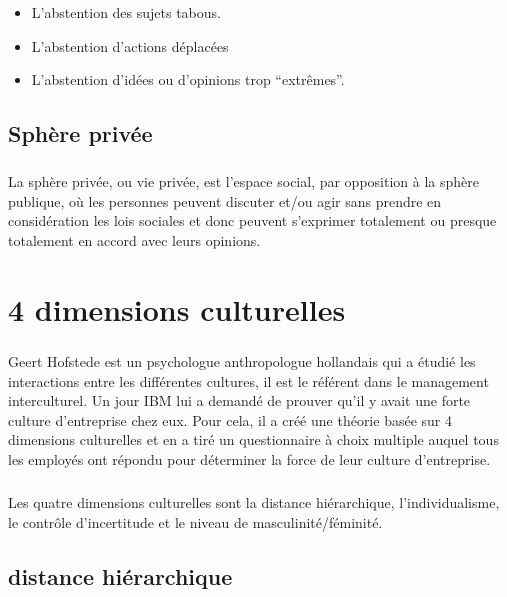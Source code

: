 \begin{itemize}
	\item L'abstention des sujets tabous.
	\item L'abstention d'actions déplacées
	\item L'abstention d'idées ou d'opinions trop ``extrêmes''.
\end{itemize}

\section{Sphère privée}

\paragraph{} La sphère privée, ou vie privée, est l'espace social, par
opposition à la sphère publique, où les personnes peuvent discuter et/ou agir
sans prendre en considération les lois sociales et donc peuvent s'exprimer
totalement ou presque totalement en accord avec leurs opinions.

\chapter{4 dimensions culturelles}

\paragraph{} Geert Hofstede est un psychologue anthropologue hollandais qui a
étudié les interactions entre les différentes cultures, il est le référent dans
le management interculturel. Un jour IBM lui a demandé de prouver qu’il y avait
une forte culture d’entreprise chez eux. Pour cela, il a créé une théorie basée
sur 4 dimensions culturelles et en a tiré un questionnaire à choix multiple
auquel tous les employés ont répondu pour déterminer la force de leur culture
d’entreprise.

\paragraph{} Les quatre dimensions culturelles sont la distance hiérarchique,
l’individualisme, le contrôle d’incertitude et le niveau de
masculinité/féminité.

\section{distance hiérarchique}

